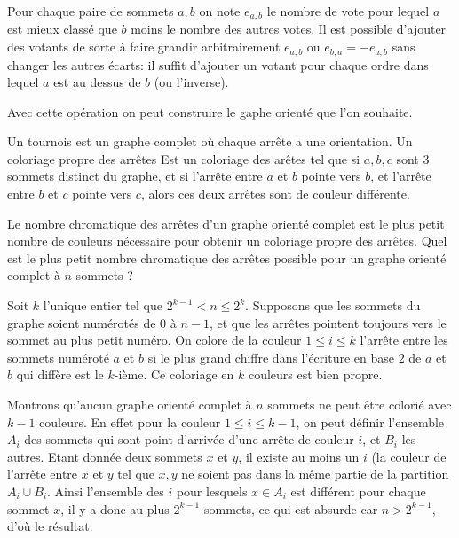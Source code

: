\begin{sol}
Pour chaque paire de sommets $a,b$ on note $e_{a,b}$ le nombre de vote pour lequel $a$ est mieux classé que $b$ moins le nombre des autres votes. Il est possible d'ajouter des votants de sorte à faire grandir arbitrairement $e_{a,b}$ ou $e_{b,a}=-e_{a,b}$ sans changer les autres écarts: il suffit d'ajouter un votant pour chaque ordre dans lequel $a$ est au dessus de $b$ (ou l'inverse).

\medskip

Avec cette opération on peut construire le gaphe orienté que l'on souhaite.
\end{sol}


\begin{exo}
Un tournois est un graphe complet où chaque arrête a une orientation. Un coloriage propre des arrêtes Est un coloriage des arêtes tel que si $a,b,c$ sont 3 sommets distinct du graphe, et si l'arrête entre $a$ et $b$ pointe vers $b$, et l'arrête entre $b$ et $c$ pointe vers $c$, alors ces deux arrêtes sont de couleur différente. 

Le nombre chromatique des arrêtes d'un graphe orienté complet est le plus petit nombre de couleurs nécessaire pour obtenir un coloriage propre des arrêtes. Quel est le plus petit nombre chromatique des arrêtes possible pour un graphe orienté complet à $n$ sommets ?
\end{exo}

\begin{sol}

Soit $k$ l'unique entier tel que $2^{k-1}<n\leq 2^k$. Supposons que les sommets du graphe soient numérotés de $0$ à $n-1$, et que les arrêtes pointent toujours vers le sommet au plus petit numéro. On colore de la couleur $1\leq i\leq k$ l'arrête entre les sommets numéroté $a$ et $b$ si le plus grand chiffre dans l'écriture en base $2$ de $a$ et $b$ qui diffère est le $k$-ième. Ce coloriage en $k$ couleurs est bien propre.

\medskip

Montrons qu'aucun graphe orienté complet à $n$ sommets ne peut être colorié avec $k-1$ couleurs. En effet pour la couleur $1\leq i\leq k-1$, on peut définir l'ensemble $A_i$ des sommets qui sont point d'arrivée d'une arrête de couleur $i$, et $B_i$ les autres. Etant donnée deux sommets $x$ et $y$, il existe au moins un $i$ (la couleur de l'arrête entre $x$ et $y$ tel que $x,y$ ne soient pas dans la même partie de la partition $A_i\cup B_i$. Ainsi l'ensemble des $i$ pour lesquels $x\in A_i$ est différent pour chaque sommet $x$, il y a donc au plus $2^{k-1}$ sommets, ce qui est absurde car $n>2^{k-1}$, d'où le résultat.

\end{sol}


